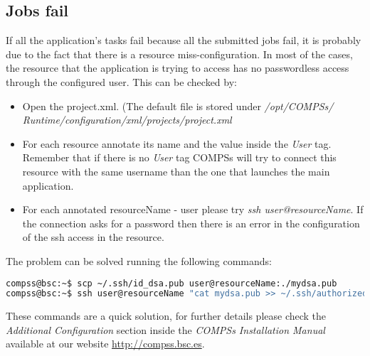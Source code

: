 \subsection{Jobs fail}
If all the application's tasks fail because all the submitted jobs fail, it is probably due to the fact that there is a resource 
miss-configuration. In most of the cases, the resource that the application is trying to access has no passwordless access through
the configured user. This can be checked by:
\begin{itemize}
 \item Open the project.xml. (The default file is stored under \textit{/opt/COMPSs/
 Runtime/configuration/xml/projects/project.xml}
 \item For each resource annotate its name and the value inside the \textit{User} tag. Remember that if there is no \textit{User}
 tag COMPSs will try to connect this resource with the same username than the one that launches the main application.
 \item For each annotated resourceName - user please try \textit{ssh user@resourceName}. If the connection asks for a password then
 there is an error in the configuration of the ssh access in the resource.
\end{itemize}

The problem can be solved running the following commands:
\begin{lstlisting}[language=bash]
compss@bsc:~$ scp ~/.ssh/id_dsa.pub user@resourceName:./mydsa.pub
compss@bsc:~$ ssh user@resourceName "cat mydsa.pub >> ~/.ssh/authorized_keys; rm ./mydsa.pub"
\end{lstlisting}

These commands are a quick solution, for further details please check the \textit{Additional Configuration} section 
inside the \textit{COMPSs Installation Manual} available at our website \url{http://compss.bsc.es}.

